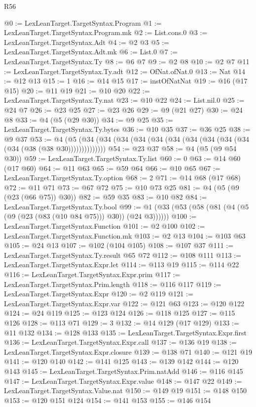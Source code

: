 \begin{lexlean}{R56}
\begin{coremodule}
@0 := LexLeanTarget.TargetSyntax.Program
@1 := LexLeanTarget.TargetSyntax.Program.mk
@2 := List.cons.{0}
@3 := LexLeanTarget.TargetSyntax.Adt
@4 := @2 @3
@5 := LexLeanTarget.TargetSyntax.Adt.mk
@6 := List.{0}
@7 := LexLeanTarget.TargetSyntax.Ty
@8 := @6 @7
@9 := @2 @8
@10 := @2 @7
@11 := LexLeanTarget.TargetSyntax.Ty.adt
@12 := OfNat.ofNat.{0}
@13 := Nat
@14 := @12 @13
@15 := 1
@16 := @14 @15
@17 := instOfNatNat
@19 := @16 (@17 @15)
@20 := @11 @19
@21 := @10 @20
@22 := LexLeanTarget.TargetSyntax.Ty.nat
@23 := @10 @22
@24 := List.nil.{0}
@25 := @24 @7
@26 := @23 @25
@27 := @23 @26
@29 := @9 (@21 @27)
@30 := @24 @8
@33 := @4 (@5 (@29 @30))
@34 := @9 @25
@35 := LexLeanTarget.TargetSyntax.Ty.bytes
@36 := @10 @35
@37 := @36 @25
@38 := @9 @37
@53 := @4 (@5 (@34 (@34 (@34 (@34 (@34 (@34 (@34 (@34 (@34 (@34 (@34 (@38 (@38 @30))))))))))))))
@54 := @23 @37
@58 := @4 (@5 (@9 @54 @30))
@59 := LexLeanTarget.TargetSyntax.Ty.list
@60 := 0
@63 := @14 @60 (@17 @60)
@64 := @11 @63
@65 := @59 @64
@66 := @10 @65
@67 := LexLeanTarget.TargetSyntax.Ty.option
@68 := 2
@71 := @14 @68 (@17 @68)
@72 := @11 @71
@73 := @67 @72
@75 := @10 @73 @25
@81 := @4 (@5 (@9 (@23 (@66 @75)) @30))
@82 := @59 @35
@83 := @10 @82
@84 := LexLeanTarget.TargetSyntax.Ty.bool
@99 := @1 (@33 (@53 (@58 (@81 (@4 (@5 (@9 (@23 (@83 (@10 @84 @75))) @30)) (@24 @3))))))
@100 := LexLeanTarget.TargetSyntax.Function
@101 := @2 @100
@102 := LexLeanTarget.TargetSyntax.Function.mk
@103 := @2 @13
@104 := @103 @63
@105 := @24 @13
@107 := @102 (@104 @105)
@108 := @107 @37
@111 := LexLeanTarget.TargetSyntax.Ty.result @65 @72
@112 := @108 @111
@113 := LexLeanTarget.TargetSyntax.Expr.let
@114 := @113 @19
@115 := @114 @22
@116 := LexLeanTarget.TargetSyntax.Expr.prim
@117 := LexLeanTarget.TargetSyntax.Prim.length
@118 := @116 @117
@119 := LexLeanTarget.TargetSyntax.Expr
@120 := @2 @119
@121 := LexLeanTarget.TargetSyntax.Expr.var
@122 := @121 @63
@123 := @120 @122
@124 := @24 @119
@125 := @123 @124
@126 := @118 @125
@127 := @115 @126
@128 := @113 @71
@129 := 3
@132 := @14 @129 (@17 @129)
@133 := @11 @132
@134 := @128 @133
@135 := LexLeanTarget.TargetSyntax.Expr.first
@136 := LexLeanTarget.TargetSyntax.Expr.call
@137 := @136 @19
@138 := LexLeanTarget.TargetSyntax.Expr.closure
@139 := @138 @71
@140 := @121 @19
@141 := @120 @140
@142 := @141 @125
@143 := @139 @142
@144 := @120 @143
@145 := LexLeanTarget.TargetSyntax.Prim.natAdd
@146 := @116 @145
@147 := LexLeanTarget.TargetSyntax.Expr.value
@148 := @147 @22
@149 := LexLeanTarget.TargetSyntax.Value.nat
@150 := @149 @19
@151 := @148 @150
@153 := @120 @151 @124
@154 := @141 @153
@155 := @146 @154

\end{coremodule}
\end{lexlean}
